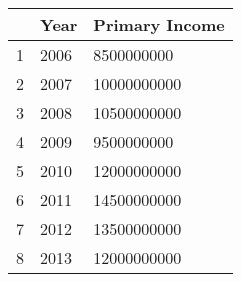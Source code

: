 \begin{tabular}{lll}
\toprule
 & Year  & Primary Income \\
\midrule
1 & 2006  & 8500000000 \\
2 & 2007  & 10000000000 \\
3 & 2008  & 10500000000 \\
4 & 2009  & 9500000000 \\
5 & 2010  & 12000000000 \\
6 & 2011  & 14500000000 \\
7 & 2012  & 13500000000 \\
8 & 2013  & 12000000000 \\
\bottomrule
\end{tabular}
